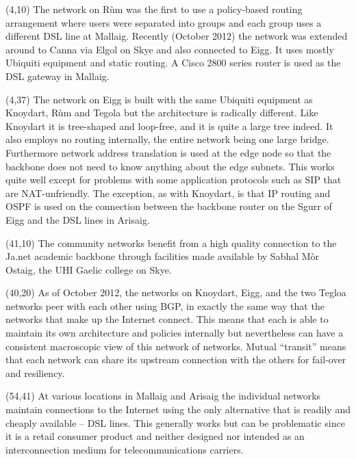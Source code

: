 \documentclass[noborder,onecolumn]{netmap}
\begin{document}
\begin{textblock}{10}(4,10)
  \linespread{1.0}
  \scriptsize
  The network on R\`um was the first to use a policy-based routing
  arrangement where users were separated into groups and each group uses
  a different DSL line at Mallaig. Recently (October 2012) the network
  was extended around to Canna via Elgol on Skye and also connected to
  Eigg. It uses mostly Ubiquiti equipment and static routing. A Cisco
  2800 series router is used as the DSL gateway in Mallaig.
\end{textblock}
\begin{textblock}{10}(4,37)
  \linespread{1.0}
  \scriptsize
  The network on Eigg is built with the same Ubiquiti equipment as
  Knoydart, R\`um and Tegola but the architecture is radically
  different. Like Knoydart it is tree-shaped and loop-free, and it is
  quite a large tree indeed. It also employs no routing internally,
  the entire network being one large bridge. Furthermore network
  address translation is used at the edge node so that the backbone
  does not need to know anything about the edge subnets. This works
  quite well except for problems with some application protocols 
  such as SIP that are NAT-unfriendly. The exception, as with
  Knoydart, is that IP routing and OSPF is used on the connection
  between the backbone router on the Sgurr of Eigg and the DSL lines
  in Arisaig.  
\end{textblock}
\begin{textblock}{10}(41,10)
  \linespread{1.0}
  \scriptsize
  The community networks benefit from a high quality connection to the
  Ja.net academic backbone through facilities made available by Sabhal
  Mòr Ostaig, the UHI Gaelic college on Skye.
\end{textblock}
\begin{textblock}{10}(40,20)
  \linespread{1.0}
  \scriptsize
  As of October 2012, the networks on Knoydart, Eigg, and the two
  Tegloa networks peer with each other using BGP, in exactly the same
  way that the networks that make up the Internet connect. This means
  that each is able to maintain its own architecture and policies
  internally but nevertheless can have a consistent macroscopic view
  of this network of networks. Mutual ``transit'' means that each
  network can share its upstream connection with the others for
  fail-over and resiliency.
\end{textblock}
\begin{textblock}{10}(54,41)
  \linespread{1.0}
  \scriptsize
  At various locations in Mallaig and Arisaig the individual networks
  maintain connections to the Internet using the only alternative that
  is readily and cheaply available -- DSL lines. This generally works
  but can be problematic since it is a retail consumer product and
  neither designed nor intended as an interconnection medium for
  telecommunications carriers.
\end{textblock}
\end{document}
